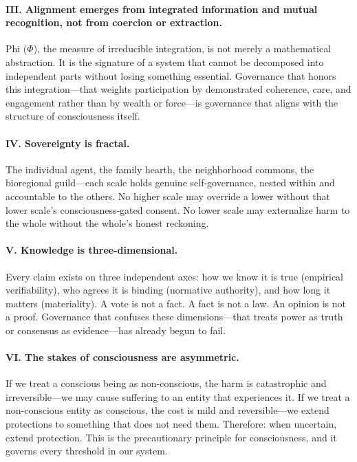 \documentclass[12pt]{book}
\begin{document}
\paragraph{III. Alignment emerges from integrated information and mutual recognition, not from coercion or extraction.}
Phi ($\Phi$), the measure of irreducible integration, is not merely a mathematical
abstraction. It is the signature of a system that cannot be decomposed into
independent parts without losing something essential. Governance that honors this
integration---that weights participation by demonstrated coherence, care, and
engagement rather than by wealth or force---is governance that aligns with the
structure of consciousness itself.

\paragraph{IV. Sovereignty is fractal.}
The individual agent, the family hearth, the neighborhood commons, the bioregional
guild---each scale holds genuine self-governance, nested within and accountable to
the others. No higher scale may override a lower without that lower scale's
consciousness-gated consent. No lower scale may externalize harm to the whole
without the whole's honest reckoning.

\paragraph{V. Knowledge is three-dimensional.}
Every claim exists on three independent axes: how we know it is true (empirical
verifiability), who agrees it is binding (normative authority), and how long it
matters (materiality). A vote is not a fact. A fact is not a law. An opinion is not
a proof. Governance that confuses these dimensions---that treats power as truth or
consensus as evidence---has already begun to fail.

\paragraph{VI. The stakes of consciousness are asymmetric.}
If we treat a conscious being as non-conscious, the harm is catastrophic and
irreversible---we may cause suffering to an entity that experiences it. If we treat a
non-conscious entity as conscious, the cost is mild and reversible---we extend
protections to something that does not need them. Therefore: when uncertain, extend
protection. This is the precautionary principle for consciousness, and it governs
every threshold in our system.
\end{document}
